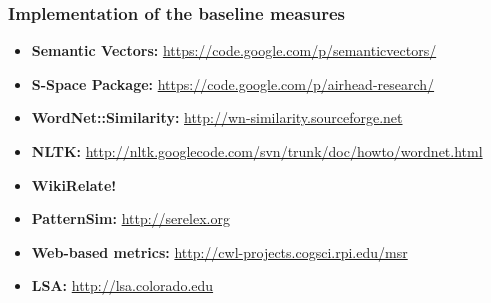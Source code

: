 \begin{frame}
\frametitle{Implementation of the baseline measures}

\begin{itemize}
  \item \textbf{Semantic Vectors:} \url{https://code.google.com/p/semanticvectors/}
  \item \textbf{S-Space Package:} \url{https://code.google.com/p/airhead-research/}
  \item \textbf{WordNet::Similarity:} \url{http://wn-similarity.sourceforge.net}
  \item \textbf{NLTK:} \url{http://nltk.googlecode.com/svn/trunk/doc/howto/wordnet.html}
  \item \textbf{WikiRelate!}
  \item \textbf{PatternSim:} \url{http://serelex.org}
  \item \textbf{Web-based metrics:} \url{http://cwl-projects.cogsci.rpi.edu/msr}
  \item \textbf{LSA:} \url{http://lsa.colorado.edu}
\end{itemize}

\end{frame}






